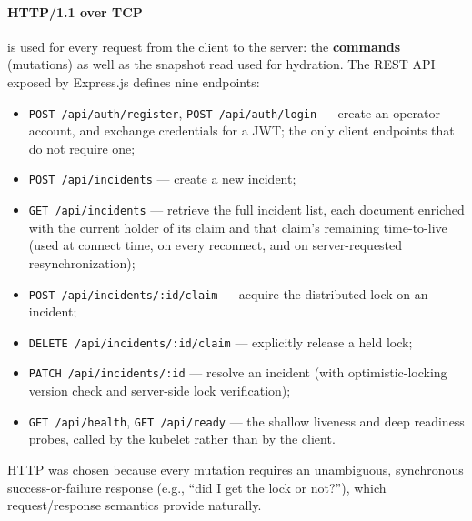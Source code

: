 \documentclass{scrartcl}
\begin{document}
\paragraph{HTTP/1.1 over TCP} is used for every request from the client to the server: the \textbf{commands} (mutations) as well as the snapshot read used for hydration. The REST API exposed by Express.js defines nine endpoints:
%
\begin{itemize}
  \item \texttt{POST /api/auth/register}, \texttt{POST /api/auth/login} --- create an operator account, and exchange credentials for a JWT; the only client endpoints that do not require one;
  \item \texttt{POST /api/incidents} --- create a new incident;
  \item \texttt{GET /api/incidents} --- retrieve the full incident list, each document enriched with the current holder of its claim and that claim's remaining time-to-live (used at connect time, on every reconnect, and on server-requested resynchronization);
  \item \texttt{POST /api/incidents/:id/claim} --- acquire the distributed lock on an incident;
  \item \texttt{DELETE /api/incidents/:id/claim} --- explicitly release a held lock;
  \item \texttt{PATCH /api/incidents/:id} --- resolve an incident (with optimistic-locking version check and server-side lock verification);
  \item \texttt{GET /api/health}, \texttt{GET /api/ready} --- the shallow liveness and deep readiness probes, called by the kubelet rather than by the client.
\end{itemize}
%
HTTP was chosen because every mutation requires an unambiguous, synchronous success-or-failure response (e.g., ``did I get the lock or not?''), which request/response semantics provide naturally.
\end{document}

